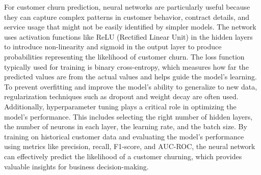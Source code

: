 For customer churn prediction, neural networks are particularly useful because they can capture complex patterns in customer behavior, contract details, and service usage that might not be easily identified by simpler models. The network uses activation functions like ReLU (Rectified Linear Unit) in the hidden layers to introduce non-linearity and sigmoid in the output layer to produce probabilities representing the likelihood of customer churn. The loss function typically used for training is binary cross-entropy, which measures how far the predicted values are from the actual values and helps guide the model’s learning.\\

To prevent overfitting and improve the model’s ability to generalize to new data, regularization techniques such as dropout and weight decay are often used. Additionally, hyperparameter tuning plays a critical role in optimizing the model’s performance. This includes selecting the right number of hidden layers, the number of neurons in each layer, the learning rate, and the batch size. By training on historical customer data and evaluating the model’s performance using metrics like precision, recall, F1-score, and AUC-ROC, the neural network can effectively predict the likelihood of a customer churning, which provides valuable insights for business decision-making. 
